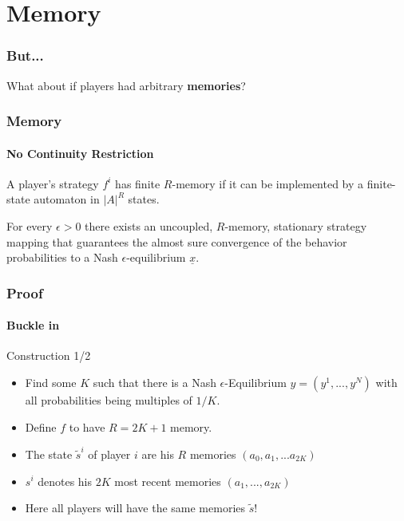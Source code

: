 \documentclass{beamer}
\newcommand{\eq}[1]{\underline{#1}}
\begin{document}

\section{Memory}

\begin{frame}
    \frametitle{But...}
    \begin{center}
        What about if players had arbitrary \textbf{memories}?
    \end{center} 
\end{frame}

\begin{frame}
    \frametitle{Memory}
    \framesubtitle{No Continuity Restriction}
    \begin{definition}
        A player's strategy $f^i$ has finite $R$-memory if it can be implemented by a finite-state 
        automaton in $|A|^R$ states.
    \end{definition}
    \pause
    \begin{theorem}
        For every $\epsilon > 0$ there exists an uncoupled, $R$-memory,
        stationary strategy mapping that guarantees the
        almost sure convergence of the behavior probabilities to a Nash $\epsilon$-equilibrium $\eq{x}$.
    \end{theorem}
\end{frame}


\begin{frame}
    \frametitle{Proof}
    \framesubtitle{Buckle in}

    \begin{exampleblock}{Construction 1/2}
        \begin{itemize}
            \item<1-> Find some $K$ such that there is a Nash $\epsilon$-Equilibrium $y = (y^1, ..., y^N)$
		    with all probabilities being multiples of $1/K$.
            \item<2-> Define $f$ to have $R = 2K + 1$ memory.
        \end{itemize}
    \end{exampleblock}
    \begin{definition}
        \begin{itemize}
            \item<3-> The state $\tilde{s}^i$ of player $i$ are his $R$ memories
                $(a_0, a_1, ... a_{2K})$
            \item<4-> $s^i$ denotes his $2K$ most recent memories $(a_1, ..., a_{2K})$ 
            \item<5- | alert@5> Here all players will have the same memories $\tilde{s}$!
        \end{itemize}
    \end{definition}
\end{frame}
\end{document}
